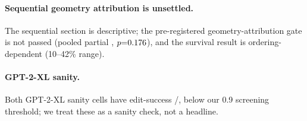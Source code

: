 \paragraph{Sequential geometry attribution is unsettled.} The sequential
section is descriptive; the pre-registered geometry-attribution gate is not
passed (pooled partial \seqHone{}, $p{=}0.176{}$), and the survival result
is ordering-dependent (10--42\% range).

\paragraph{GPT-2-XL sanity.} Both GPT-2-XL sanity cells have edit-success
\gptEsrL{}/\gptEsrH{}, below our 0.9 screening threshold; we treat these as a
sanity check, not a headline.
